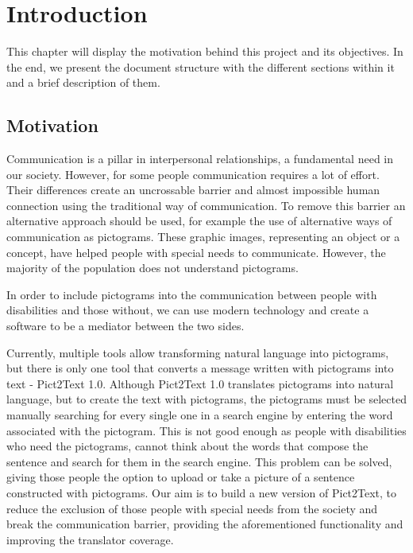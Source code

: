 
\chapter{Introduction}
\label{cap:introduction}

This chapter will display the motivation behind this project and its objectives. In the end, we present the document structure with the different sections within it and a brief description of them.

\section{Motivation}
Communication is a pillar in interpersonal relationships, a fundamental need in our society. However, for some people communication requires a lot of effort. Their differences create an uncrossable barrier and almost impossible human connection using the traditional way of communication. To remove this barrier an alternative approach should be used, for example the use of alternative ways of communication as pictograms. These graphic images, representing an object or a concept, have helped people with special needs to communicate. However, the majority of the population does not understand pictograms.

In order to include pictograms into the communication between people with disabilities and those without, we can use modern technology and create a software to be a mediator between the two sides. 

Currently, multiple tools allow transforming natural language into pictograms, but there is only one tool that converts a message written with pictograms into text - Pict2Text 1.0. Although Pict2Text 1.0 translates pictograms into natural language, but to create the text with pictograms, the pictograms must be selected manually searching for every single one in a search engine by entering the word associated with the pictogram. This is not good enough as people with disabilities who need the pictograms, cannot think about the words that compose the sentence and search for them in the search engine. This problem can be solved, giving those people the option to upload or take a picture of a sentence constructed with pictograms. Our aim is to build a new version of Pict2Text, to reduce the exclusion of those people with special needs from the society and break the communication barrier, providing the aforementioned functionality and improving the translator coverage.

